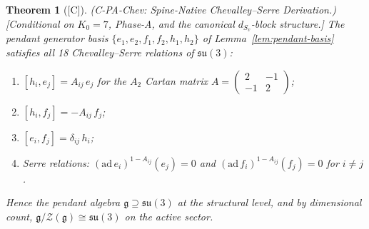 \documentclass[12pt,oneside]{amsbook}
\theoremstyle{plain}
\newtheorem{theorem}{Theorem}[section]
\theoremstyle{definition}
\theoremstyle{remark}
\newcommand{\status}[1]{\textup{[#1]}}
\begin{document}
\begin{theorem}[\status{C}]\label{thm:chev-serre-spine}
\textup{(C-PA-Chev: Spine-Native Chevalley--Serre Derivation.)}
\textup{[Conditional on $K_0=7$, Phase-A, and the canonical
$d_{S_v}$-block structure.]}
The pendant generator basis $\{e_1, e_2, f_1, f_2, h_1, h_2\}$
of Lemma~\ref{lem:pendant-basis} satisfies all 18 Chevalley--Serre
relations of $\mathfrak{su}(3)$:
\begin{enumerate}[label=\textup{(\arabic*)}]
 \item $[h_i, e_j] = A_{ij}\,e_j$ for the $A_2$ Cartan matrix
 $A = \begin{pmatrix} 2 & -1 \\ -1 & 2\end{pmatrix}$;
 \item $[h_i, f_j] = -A_{ij}\,f_j$;
 \item $[e_i, f_j] = \delta_{ij}\,h_i$;
 \item Serre relations: $(\mathrm{ad}\,e_i)^{1-A_{ij}}(e_j) = 0$
 and $(\mathrm{ad}\,f_i)^{1-A_{ij}}(f_j) = 0$ for $i \neq j$.
\end{enumerate}
Hence the pendant algebra $\mathfrak{g} \supseteq
\mathfrak{su}(3)$ at the structural level, and by dimensional
count, $\mathfrak{g}/\mathcal{Z}(\mathfrak{g}) \cong
\mathfrak{su}(3)$ on the active sector.
\end{theorem}
\end{document}
